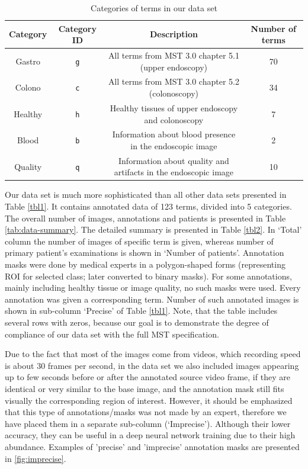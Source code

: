 \documentclass[preprint]{article}
\renewcommand{\onecolumn}{}
\renewcommand{\twocolumn}{}
\newcommand{\tabletextsize}{\tiny}
\begin{document}
\onecolumn

\tabletextsize
\begin{longtable}{c|c|c|c}
\caption{Categories of terms in our data set} \label{tbl2a} \\
Category & Category ID & Description & Number of terms \\ \hline
Gastro & \texttt{g} & All terms from MST 3.0 chapter 5.1 (upper endoscopy) & 70 \\
Colono & \texttt{c} & All terms from MST 3.0 chapter 5.2 (colonoscopy) & 34 \\
Healthy & \texttt{h} & Healthy tissues of upper endoscopy and colonoscopy & 7 \\
Blood & \texttt{b} & Information about blood presence in the endoscopic image & 2 \\
Quality & \texttt{q} & Information about quality and artifacts in the endoscopic image & 10 
\end{longtable}
\normalsize

\twocolumn


Our data set is much more sophisticated than all other data sets presented in Table \ref{tbl1}. It contains annotated data of 123 terms, divided into 5 categories. The overall number of images, annotations and patients is presented in Table \ref{tab:data-summary}. The detailed summary is presented in Table \ref{tbl2}. In `Total' column the number of images of specific term is given, whereas number of primary patient's examinations is shown in `Number of patients'. Annotation masks were done by medical experts in a polygon-shaped forms (representing ROI for selected class; later converted to binary masks). For some annotations, mainly including healthy tissue or image quality, no such masks were used. Every annotation was given a corresponding term. Number of such annotated images is shown in sub-column `Precise' of Table \ref{tbl1}. Note, that the table includes several rows with zeros, because our goal is to demonstrate the degree of compliance of our data set with the full MST specification.

Due to the fact that most of the images come from videos, which recording speed is about 30 frames per second, in the data set we also included images appearing up to few seconds before or after the annotated source video frame, if they are identical or very similar to the base image, and the annotation mask still fits visually the corresponding region of interest. However, it should be emphasized that this type of annotations/masks was not made by an expert, therefore we have placed them in a separate sub-column (`Imprecise'). Although their lower accuracy, they can be useful in a deep neural network training due to their high abundance. Examples of 'precise' and 'imprecise' annotation masks are presented in \cref{fig:imprecise}. \label{sec:imprecise}
\end{document}
